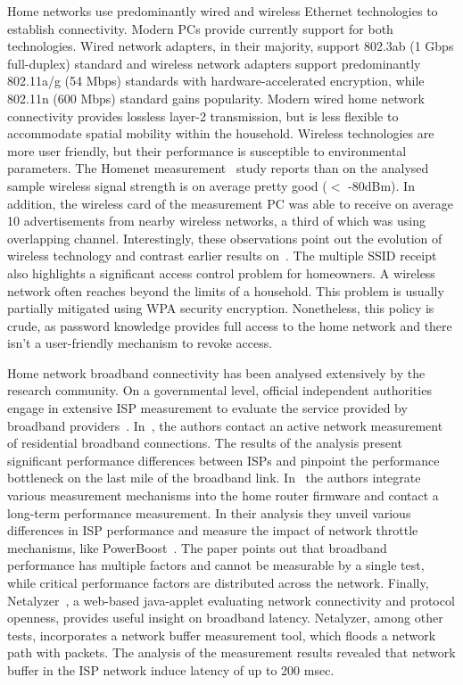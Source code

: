 Home networks use predominantly wired and wireless Ethernet technologies to
establish connectivity. Modern PCs provide currently support for both
technologies. Wired network adapters, in their majority, support 802.3ab (1 Gbps
full-duplex) standard and wireless network adapters support predominantly
802.11a/g (54 Mbps) standards with hardware-accelerated encryption, while
802.11n (600 Mbps) standard gains popularity. Modern wired home network
connectivity provides lossless layer-2 transmission, but is less flexible to
accommodate spatial mobility within the household. Wireless technologies are
more user friendly, but their performance is susceptible to environmental
parameters.  The Homenet measurement~\cite{homenetProfiler} study reports than
on the analysed sample wireless signal strength is on average pretty good ($<$
-80dBm). In addition, the wireless card of the measurement PC was able to
receive on average 10 advertisements from nearby wireless networks, a third of
which was using overlapping channel.  Interestingly, these observations point
out the evolution of wireless technology and contrast earlier results
on~\cite{Yarvis05characterizationof}.  The multiple SSID receipt also highlights a
significant access control problem for homeowners.  A wireless network often
reaches beyond the limits of a household.  This problem is usually partially
mitigated using WPA security encryption.  Nonetheless, this policy is crude, as
password knowledge provides full access to the home network and there
isn't a user-friendly mechanism to revoke access.

Home network broadband connectivity has been analysed extensively by the
research community. On a governmental level, official independent authorities
engage in extensive ISP measurement to evaluate the service provided by
broadband providers~\cite{fcc, ofcom}. In~\cite{Dischinger2007}, the authors
contact an active network measurement of residential broadband connections. The
results of the analysis present significant performance differences between ISPs
and pinpoint the performance bottleneck on the last mile of the broadband link.
In~\cite{Sundaresan2011} the authors integrate various measurement mechanisms
into
the home router firmware and contact a long-term performance measurement.  In
their analysis they unveil various differences in ISP performance and measure
the impact of network throttle mechanisms, like PowerBoost~\cite{powerboost}.
The paper points out that broadband performance has multiple factors and cannot
be measurable by a single test, while critical performance factors are
distributed across the network.  Finally, Netalyzer~\cite{Kreibich10}, a
web-based java-applet evaluating network connectivity and protocol openness,
provides useful insight on broadband latency.  Netalyzer, among other tests,
incorporates a network buffer measurement tool, which floods a network path with
packets.  The analysis of the measurement results revealed that network buffer
in the ISP network induce latency of up to 200 msec. 


